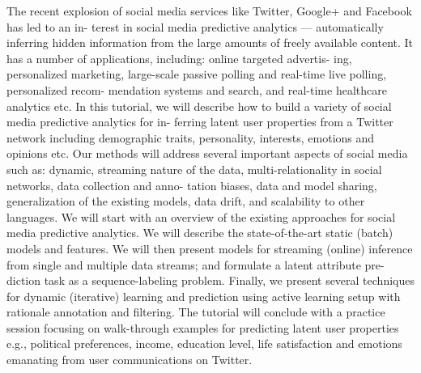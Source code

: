 The recent explosion of social media services like Twitter, Google+ and Facebook has led to an in- terest in social media predictive analytics --- automatically inferring hidden information from the large amounts of freely available content. It has a number of applications, including: online targeted advertis- ing, personalized marketing, large-scale passive polling and real-time live polling, personalized recom- mendation systems and search, and real-time healthcare analytics etc. In this tutorial, we will describe how to build a variety of social media predictive analytics for in- ferring latent user properties from a Twitter network including demographic traits, personality, interests, emotions and opinions etc. Our methods will address several important aspects of social media such as: dynamic, streaming nature of the data, multi-relationality in social networks, data collection and anno- tation biases, data and model sharing, generalization of the existing models, data drift, and scalability to other languages. We will start with an overview of the existing approaches for social media predictive analytics. We will describe the state-of-the-art static (batch) models and features. We will then present models for streaming (online) inference from single and multiple data streams; and formulate a latent attribute pre- diction task as a sequence-labeling problem. Finally, we present several techniques for dynamic (iterative) learning and prediction using active learning setup with rationale annotation and filtering. The tutorial will conclude with a practice session focusing on walk-through examples for predicting latent user properties e.g., political preferences, income, education level, life satisfaction and emotions emanating from user communications on Twitter.
